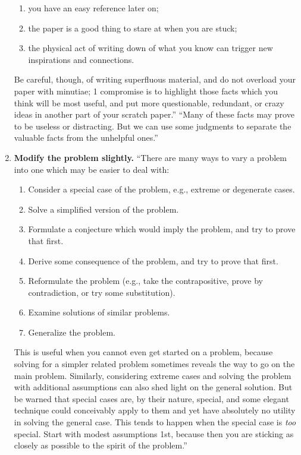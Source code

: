 \documentclass{article}
\numberwithin{equation}{section}
\begin{document}
\begin{enumerate}
\begin{enumerate}
		\item you have an easy reference later on;
		\item the paper is a good thing to stare at when you are stuck;
		\item the physical act of writing down of what you know can trigger new inspirations and connections.
	\end{enumerate}
	Be careful, though, of writing superfluous material, and do not overload your paper with minutiae; 1 compromise is to highlight those facts which you think will be most useful, and put more questionable, redundant, or crazy ideas in another part of your scratch paper.'' ``Many of these facts may prove to be useless or distracting. But we can use some judgments to separate the valuable facts from the unhelpful ones.''
	\item \textbf{Modify the problem slightly.} ``There are many ways to vary a problem into one which may be easier to deal with:
	\begin{enumerate}
		\item Consider a special case of the problem, e.g., extreme or degenerate cases.
		\item Solve a simplified version of the problem.
		\item Formulate a conjecture which would imply the problem, and try to prove that first.
		\item Derive some consequence of the problem, and try to prove that first.
		\item Reformulate the problem (e.g., take the contrapositive, prove by contradiction, or try some substitution).
		\item Examine solutions of similar problems.
		\item Generalize the problem.
	\end{enumerate}
	This is useful when you cannot even get started on a problem, because solving for a simpler related problem sometimes reveals the way to go on the main problem. Similarly, considering extreme cases and solving the problem with additional assumptions can also shed light on the general solution. But be warned that special cases are, by their nature, special, and some elegant technique could conceivably apply to them and yet have absolutely no utility in solving the general case. This tends to happen when the special case is \textit{too} special. Start with modest assumptions 1st, because then you are sticking as closely as possible to the spirit of the problem.''

\end{enumerate}
\end{document}
